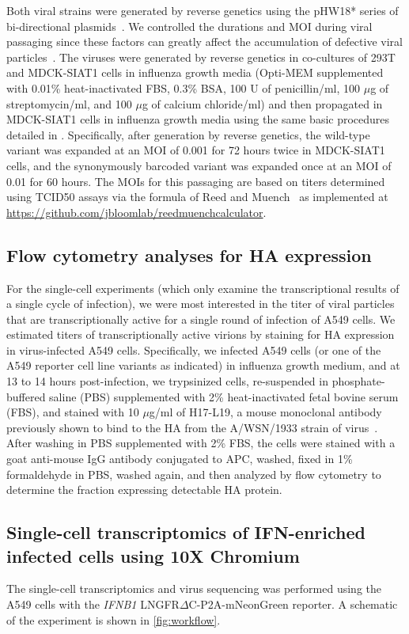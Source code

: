 \documentclass[10pt,letterpaper]{article}
\newcommand{\FIG}[1]{\autoref{fig:#1}}
\begin{document}
Both viral strains were generated by reverse genetics using the pHW18* series of bi-directional plasmids~\citep{hoffmann2000dna}.
We controlled the durations and MOI during viral passaging since these factors can greatly affect the accumulation of defective viral particles~\citep{xue2016propagation}.
The viruses were generated by reverse genetics in co-cultures of 293T and MDCK-SIAT1 cells in influenza growth media (Opti-MEM supplemented with 0.01\% heat-inactivated FBS, 0.3\% BSA, 100 U of penicillin/ml, 100 $\mu$g of streptomycin/ml, and 100 $\mu$g of calcium chloride/ml) and then propagated in MDCK-SIAT1 cells in influenza growth media using the same basic procedures detailed in \citep{russell2018extreme}.
Specifically, after generation by reverse genetics, the wild-type variant was expanded at an MOI of 0.001 for 72 hours twice in MDCK-SIAT1 cells, and the synonymously barcoded variant was expanded once at an MOI of 0.01 for 60 hours.
The MOIs for this passaging are based on titers determined using TCID50 assays via the formula of Reed and Muench~\citep{reed1938simple} as implemented at \url{https://github.com/jbloomlab/reedmuenchcalculator}.

\subsection*{Flow cytometry analyses for HA expression}
For the single-cell experiments (which only examine the transcriptional results of a single cycle of infection), we were most interested in the titer of viral particles that are transcriptionally active for a single round of infection of A549 cells.
We estimated titers of transcriptionally active virions by staining for HA expression in virus-infected A549 cells.
Specifically, we infected A549 cells (or one of the A549 reporter cell line variants as indicated) in influenza growth medium, and at 13 to 14 hours post-infection, we trypsinized cells, re-suspended in phosphate-buffered saline (PBS) supplemented with 2\% heat-inactivated fetal bovine serum (FBS), and stained with 10 $\mu$g/ml of H17-L19, a mouse monoclonal antibody previously shown to bind to the HA from the A/WSN/1933 strain of virus~\citep{doud2017complete}.
After washing in PBS supplemented with 2\% FBS, the cells were stained with a goat anti-mouse IgG antibody conjugated to APC, washed, fixed in 1\% formaldehyde in PBS, washed again, and then analyzed by flow cytometry to determine the fraction expressing detectable HA protein.

\subsection*{Single-cell transcriptomics of IFN-enriched infected cells using 10X Chromium}
The single-cell transcriptomics and virus sequencing was performed using the A549 cells with the \textit{IFNB1} LNGFR$\Delta$C-P2A-mNeonGreen reporter.
A schematic of the experiment is shown in \FIG{workflow}.
\end{document}
